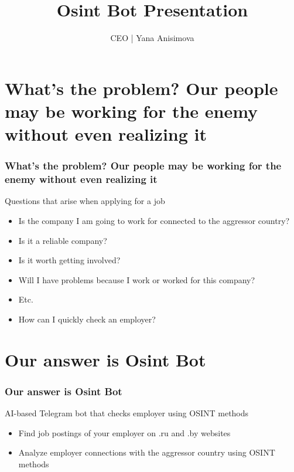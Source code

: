 \documentclass{beamer}
\title{Osint Bot Presentation}
\author{CEO | Yana Anisimova}
\begin{document}
\frame{\titlepage}

\section{What's the problem? Our people may be working for the enemy without even realizing it}

\begin{frame}
    \frametitle{What's the problem? Our people may be working for the enemy without even realizing it}
    
    \begin{block}{Questions that arise when applying for a job}
        \begin{itemize}
            \item Is the company I am going to work for connected to the aggressor country?
            \item Is it a reliable company?
            \item Is it worth getting involved?
            \item Will I have problems because I work or worked for this company?
            \item Etc.
            \item How can I quickly check an employer?
        \end{itemize}
    \end{block}
    
\end{frame}

\section{Our answer is Osint Bot}

\begin{frame}
    \frametitle{Our answer is Osint Bot}
    
    \begin{block}{AI-based Telegram bot that checks employer using OSINT methods}
        \begin{itemize}
            \item Find job postings of your employer on .ru and .by websites
            \item Analyze employer connections with the aggressor country using OSINT methods
        \end{itemize}
    \end{block}
    
\end{frame}
\end{document}
